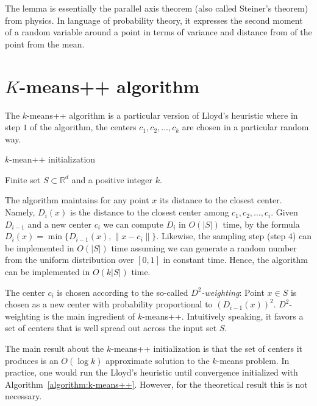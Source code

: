 \documentclass{article}
\newcommand{\R}{\mathbb{R}}
\newcommand{\norm}[1]{\|{#1}\|}
\begin{document}
The lemma is essentially the parallel axis theorem (also called Steiner's
theorem) from physics. In language of probability theory, it expresses the
second moment of a random variable around a point in terms of variance and
distance from of the point from the mean.

\section{$K$-means++ algorithm}

The $k$-means++ algorithm is a particular version of Lloyd's heuristic where in
step $1$ of the algorithm, the centers $c_1, c_2, \dots, c_k$ are chosen
in a particular random way.

\begin{algorithm}[h]
\caption{$k$-mean++ initialization \label{algorithm:k-means++}}
\begin{algorithmic}[1]
{
\REQUIRE Finite set $S \subset \R^d$ and a positive integer $k$.
\STATE{For any $x \in S$ define $D_{i-1}(x) = \min_{1 \le j \le i-1} \norm{x - c_j}$}
\ENDFOR
{}
}
\end{algorithmic}
\end{algorithm}

The algorithm maintains for any point $x$ its distance to the closest center.
Namely, $D_i(x)$ is the distance to the closest center among $c_1, c_2, \dots,
c_i$. Given $D_{i-1}$ and a new center $c_i$ we can compute $D_i$ in $O(|S|)$
time, by the formula $D_i(x) = \min\{D_{i-1}(x), \norm{x - c_i}\}$.
Likewise, the sampling step (step $4$) can be implemented in $O(|S|)$
time assuming we can generate a random number from the uniform distribution
over $[0,1]$ in constant time. Hence, the algorithm can be implemented in
$O(k|S|)$ time.

The center $c_i$ is chosen according to the so-called \emph{$D^2$-weighting}:
Point $x \in S$ is chosen as a new center with probability proportional to
$(D_{i-1}(x))^2$. $D^2$-weighting is the main ingredient of $k$-means++.
Intuitively speaking, it favors a set of centers that is well spread out across
the input set $S$.

The main result about the $k$-means++ initialization is that the set of centers
it produces is an $O(\log k)$ approximate solution to the $k$-means problem. In
practice, one would run the Lloyd's heuristic until convergence initialized
with Algorithm~\ref{algorithm:k-means++}.  However, for the theoretical result
this is not necessary.
\end{document}

